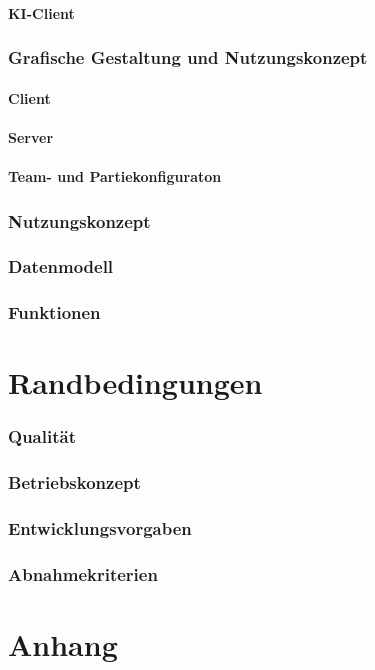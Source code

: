 \documentclass[a4paper,12pt,
headsepline,           %
oneside,               %
pointlessnumbers,      %
bibtotoc,              %
]{scrartcl}
\begin{document}
    \subsection{KI-Client}
    
    
	\section{Grafische Gestaltung und Nutzungskonzept}
    \subsection{Client}
    	
    \subsection{Server}
    	
    \subsection{Team- und Partiekonfiguraton}
    	

    \section{Nutzungskonzept}
    \section{Datenmodell}
    \section{Funktionen}

    \part{Randbedingungen}
    \section{Qualität}
    
    \section{Betriebskonzept}
    \section{Entwicklungsvorgaben}
    \section{Abnahmekriterien}

    \part{Anhang}
\end{document}
